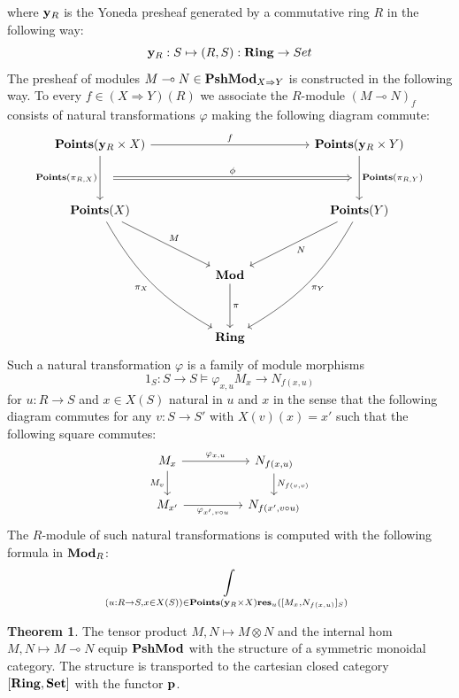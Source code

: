 \documentclass[8pt]{article}
\theoremstyle{definition}
\theoremstyle{definition}
\newtheorem{theorem}{Theorem}[section]
\theoremstyle{definition}
\theoremstyle{definition}
\theoremstyle{definition}
\theoremstyle{definition}
\theoremstyle{definition}
\theoremstyle{definition}
\theoremstyle{definition}
\theoremstyle{definition}
\theoremstyle{definition}
\theoremstyle{definition}
\theoremstyle{definition}
\theoremstyle{definition}
\theoremstyle{question}
\begin{document}
where ${\bf y}_R$ is the Yoneda presheaf generated by a commutative ring $R$ in the following way:
\[
{\bf y}_R : S \mapsto (R, S) : {\bf Ring} \to Set
\]
The presheaf of modules $M \multimap N \in {\bf PshMod}_{X \Rightarrow Y}$ is constructed in the following way. 
To every $f \in (X \Rightarrow Y)(R)$ we associate the $R$-module $(M \multimap N)_f$ consists of natural transformations $\varphi$ making the following diagram commute:
\[
\begin{tikzcd}
  {\bf Points}({\bf y}_R \times X) \ar[dd, "{\bf Points}(\pi_{R,X})"', ""{name=pi1}] \ar[rrrr, "f"] &&&& {\bf Points}({\bf y}_R \times Y)  \ar[dd, "{\bf Points}(\pi_{R,Y})", ""{name=pi2}] \\
  \\
  {\bf Points}(X) \ar[ddddrr, "\pi_X"', bend right=15] \ar[ddrr, "M"] &&&& {\bf Points}(Y) \ar[ddll, "N"] \ar[ddddll, "\pi_Y", bend left=15]\\
  \\
  && {\bf Mod} \ar[dd, "\pi"] \\
  \\
  && {\bf Ring}
  \ar[from=pi1,to=pi2, Rightarrow, "\phi", shorten=6]
\end{tikzcd}
\]
Such a natural transformation $\varphi$ is a family of module morphisms
\[
1_S : S \to S \models \varphi_{x,u} M_x \to N_{f(x,u)}
\]
for $u : R \to S$ and $x \in X(S)$ natural in $u$ and $x$ in the sense that the following diagram commutes for any $v : S \to S'$
with $X(v)(x) = x'$ such that the following square commutes:
\[
\begin{tikzcd}
  M_x \ar[rr, "\varphi_{x,u}"] \ar[d, "M_v"'] && N_{f(x,u)} \ar[d, "N_{f(v,v)}"] \\
  M_{x'} \ar[rr, "\varphi_{x',v \circ u}"'] && N_{f(x',v \circ u)}
\end{tikzcd}
\]
The $R$-module of such natural transformations is computed with the following formula in ${\bf Mod}_R$:
\[
\int \limits_{(u : R \to S, x \in X(S)) \in {\bf Points}({\bf y}_R \times X) {\bf res}_u ([M_x, N_{f(x,u)}]_S)}
\]
\begin{theorem}
  The tensor product $M,N \mapsto M \otimes N$ and the internal hom $M,N \mapsto M \multimap N$ equip ${\bf PshMod}$ with the structure of a symmetric monoidal category.
  The structure is transported to the cartesian closed category $[{\bf Ring}, {\bf Set}]$ with the functor ${\bf p}$.
\end{theorem}
 

\end{document}

